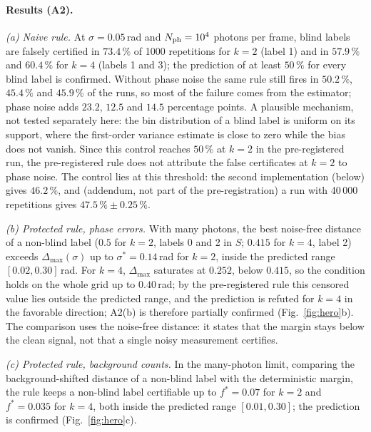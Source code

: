 \documentclass[aps,pra,reprint,superscriptaddress,nofootinbib]{revtex4-2}
\begin{document}
\paragraph*{Results (A2).}
\emph{(a) Naive rule.} At $\sigma=0.05$\,rad and $N_{\rm ph}=10^4$ photons per frame, blind labels are falsely certified in $73.4\,\%$ of 1000 repetitions for $k=2$ (label 1) and in $57.9\,\%$ and $60.4\,\%$ for $k=4$ (labels 1 and 3); the prediction of at least $50\,\%$ for every blind label is confirmed.
Without phase noise the same rule still fires in $50.2\,\%$, $45.4\,\%$ and $45.9\,\%$ of the runs, so most of the failure comes from the estimator; phase noise adds $23.2$, $12.5$ and $14.5$ percentage points. A plausible mechanism, not tested separately here: the bin distribution of a blind label is uniform on its support, where the first-order variance estimate is close to zero while the bias does not vanish.
Since this control reaches $50\,\%$ at $k=2$ in the pre-registered run, the pre-registered rule does not attribute the false certificates at $k=2$ to phase noise. The control lies at this threshold: the second implementation (below) gives $46.2\,\%$, and (addendum, not part of the pre-registration) a run with 40\,000 repetitions gives $47.5\,\%\pm0.25\,\%$.

\emph{(b) Protected rule, phase errors.} With many photons, the best noise-free distance of a non-blind label ($0.5$ for $k=2$, labels 0 and 2 in $S$; $0.415$ for $k=4$, label 2) exceeds $\Delta_{\max}(\sigma)$ up to $\sigma^*=0.14$\,rad for $k=2$, inside the predicted range $[0.02,0.30]$\,rad.
For $k=4$, $\Delta_{\max}$ saturates at $0.252$, below $0.415$, so the condition holds on the whole grid up to $0.40$\,rad; by the pre-registered rule this censored value lies outside the predicted range, and the prediction is refuted for $k=4$ in the favorable direction; A2(b) is therefore partially confirmed (Fig.~\ref{fig:hero}b).
The comparison uses the noise-free distance: it states that the margin stays below the clean signal, not that a single noisy measurement certifies.

\emph{(c) Protected rule, background counts.} In the many-photon limit, comparing the background-shifted distance of a non-blind label with the deterministic margin, the rule keeps a non-blind label certifiable up to $f^*=0.07$ for $k=2$ and $f^*=0.035$ for $k=4$, both inside the predicted range $[0.01,0.30]$; the prediction is confirmed (Fig.~\ref{fig:hero}c).
\end{document}
